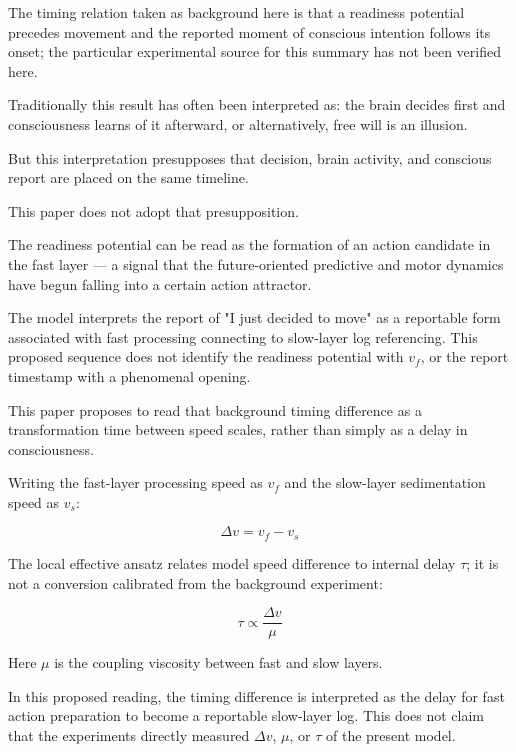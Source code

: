 The timing relation taken as background here is that a readiness potential precedes movement and the reported moment of conscious intention follows its onset; the particular experimental source for this summary has not been verified here.

Traditionally this result has often been interpreted as: the brain decides first and consciousness learns of it afterward, or alternatively, free will is an illusion.

But this interpretation presupposes that decision, brain activity, and conscious report are placed on the same timeline.

This paper does not adopt that presupposition.

The readiness potential can be read as the formation of an action candidate in the fast layer — a signal that the future-oriented predictive and motor dynamics have begun falling into a certain action attractor.

The model interprets the report of "I just decided to move" as a reportable form associated with fast processing connecting to slow-layer log referencing. This proposed sequence does not identify the readiness potential with $v_f$, or the report timestamp with a phenomenal opening.

This paper proposes to read that background timing difference as a transformation time between speed scales, rather than simply as a delay in consciousness.

Writing the fast-layer processing speed as $v_f$ and the slow-layer sedimentation speed as $v_s$:

\begin{equation}
\Delta v = v_f - v_s
\end{equation}

The local effective ansatz relates model speed difference to internal delay $\tau$; it is not a conversion calibrated from the background experiment:

\begin{equation}
\tau \propto \frac{\Delta v}{\mu}
\end{equation}

Here $\mu$ is the coupling viscosity between fast and slow layers.

In this proposed reading, the timing difference is interpreted as the delay for fast action preparation to become a reportable slow-layer log. This does not claim that the experiments directly measured $\Delta v$, $\mu$, or $\tau$ of the present model.

